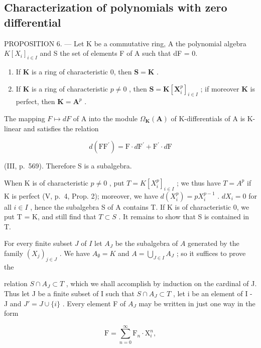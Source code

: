 \subsection{Characterization of polynomials with zero differential}

PROPOSITION 6. --- Let K be a commutative ring, A the polynomial algebra \(K[X_{i}]_{i \in I}\) and S the set of elements F of A such that dF = 0.

\begin{enumerate}
\def\labelenumi{\alph{enumi})}
\item
  If \(\mathbf{K}\) is a ring of characteristic 0, then \(\mathbf{S} = \mathbf{K}\) .
\item
  If \(\mathbf{K}\) is a ring of characteristic \(p \neq 0\) , then \(\mathbf{S} = \mathbf{K}[\mathbf{X}_i^p]_{i \in I}\) ; if moreover \(\mathbf{K}\) is perfect, then \(\mathbf{K} = \mathbf{A}^p\) .
\end{enumerate}

The mapping \(F \mapsto dF\) of A into the module \(\Omega_{\mathbf{K}}(\mathbf{A})\) of K-differentials of A is K-linear and satisfies the relation

\[
d \left(\mathrm{FF} ^ {\prime}\right) = \mathrm{F} \cdot d \mathrm{F} ^ {\prime} + \mathrm{F} ^ {\prime} \cdot d \mathrm{F}
\]

(III, p.~569). Therefore S is a subalgebra.

When K is of characteristic \(p \neq 0\) , put \(T = K[X_{i}^{p}]_{i \in I}\) ; we thus have \(T = A^{p}\) if K is perfect (V, p.~4, Prop. 2); moreover, we have \(d(X_{i}^{p}) = pX_{i}^{p-1}\) . \(dX_{i} = 0\) for all \(i \in I\) , hence the subalgebra S of A contains T. If K is of characteristic 0, we put T = K, and still find that \(T \subset S\) . It remains to show that S is contained in T.

For every finite subset \(J\) of \(I\) let \(A_{J}\) be the subalgebra of \(A\) generated by the family \((X_{j})_{j\in J}\) . We have \(A_{\emptyset} = K\) and \(A = \bigcup_{J\in I}A_{J}\) ; so it suffices to prove the

relation \(S \cap A_{J} \subset T\) , which we shall accomplish by induction on the cardinal of J. Thus let J be a finite subset of I such that \(S \cap A_{J} \subset T\) , let i be an element of I - J and \(J' = J \cup \{i\}\) . Every element F of \(A_{J}\) may be written in just one way in the form

\[
\mathrm{F} = \sum_ {n = 0} ^ {\infty} \mathrm{F} _ {n} \cdot \mathrm{X} _ {i} ^ {n},\tag{5}
\]

